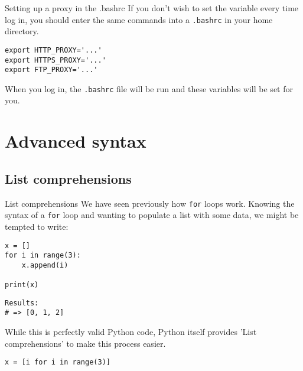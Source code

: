 \documentclass[10pt]{beamer}
\begin{document}
\begin{frame}[label={sec:org0e64f4a},fragile]{Setting up a proxy in the .bashrc}
 If you don't wish to set the variable every time log in, you should enter the same
commands into a \texttt{.bashrc} in your home directory.

\begin{verbatim}
export HTTP_PROXY='...'
export HTTPS_PROXY='...'
export FTP_PROXY='...'
\end{verbatim}

When you log in, the \texttt{.bashrc} file will be run and these variables will be set for you.
\end{frame}

\section{Advanced syntax}
\label{sec:orgf05c9e6}

\subsection{List comprehensions}
\label{sec:orgd2415c1}

\begin{frame}[label={sec:org4056d08},fragile]{List comprehensions}
 We have seen previously how \texttt{for} loops work. Knowing the syntax of a \texttt{for} loop and
wanting to populate a list with some data, we might be tempted to write:

\begin{verbatim}
x = []
for i in range(3):
    x.append(i)

print(x)
\end{verbatim}

\begin{verbatim}
Results: 
# => [0, 1, 2]
\end{verbatim}


While this is perfectly valid Python code, Python itself provides 'List
comprehensions' to make this process easier.

\begin{verbatim}
x = [i for i in range(3)]
\end{verbatim}
\end{frame}
\end{document}
